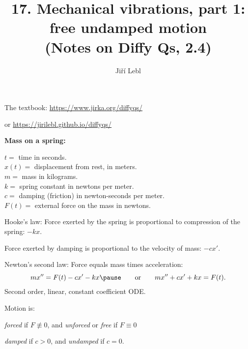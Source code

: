 \documentclass[10pt,aspectratio=169]{beamer}
\author{Ji\v{r}\'i Lebl}
\institute[OSU]{%
Oklahoma State University%
}
\title{17. Mechanical vibrations, part 1: free undamped motion\\(Notes on Diffy Qs, 2.4)}
\date{}
\begin{document}
\begin{frame}
\titlepage


\begin{center}
The textbook: \url{https://www.jirka.org/diffyqs/}

or \url{https://jirilebl.github.io/diffyqs/}
\end{center}
\end{frame}

\begin{frame}
\textbf{Mass on a spring:}

\vspace*{-12pt}
\hspace*{3in}%

\vspace*{-0.55in}
$t = {}$ time in seconds.\\
$x(t) = {}$ displacement from rest, in meters.\\
$m = {}$ mass in kilograms.\\
$k = {}$ spring constant in newtons per meter.\\
$c = {}$ damping (friction) in newton-seconds per meter.\\
$F(t) = {}$ external force on the mass in newtons.

\medskip
\pause

Hooke's law: 
Force exerted by the spring is proportional to
compression of the spring: $-kx$.

\pause
Force exerted by damping is proportional to the velocity of mass: $-cx'$.

\pause
Newton's second law: Force equals mass times acceleration:
\[
mx'' = F(t)-cx'-kx
\pause
\qquad
\text{or}
\qquad
mx'' + cx' + kx = F(t) .
\]
\pause
Second order, linear, constant coefficient ODE.

\medskip
\pause

Motion is:

\vspace*{-12pt}%
\hspace*{1in}%
\emph{forced} if $F \not\equiv 0$, \quad and
\emph{unforced} or \emph{free} if $F \equiv 0$

\pause
\hspace*{1in}%
\emph{damped} if $c > 0$, \quad
and \emph{undamped} if $c = 0$.
\end{frame}
\end{document}
